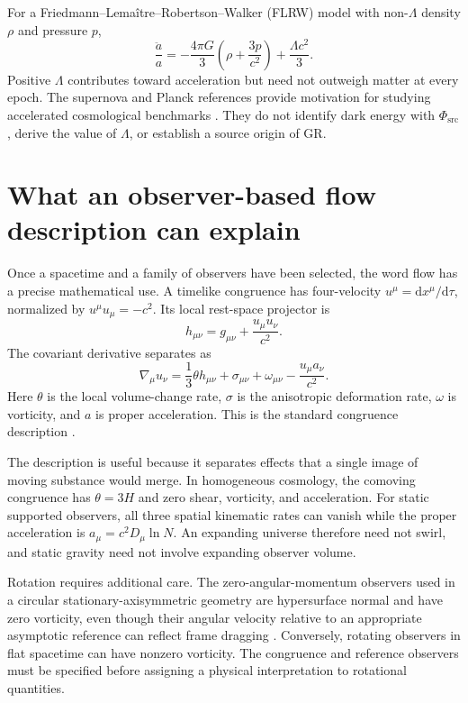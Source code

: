 \documentclass[11pt,oneside]{report}
\newcommand{\PhiSrc}{\Phi_{\mathrm{src}}}
\newcommand{\dd}{\mathrm d}
\theoremstyle{remark}
\numberwithin{definition}{chapter}
\numberwithin{proposition}{chapter}
\numberwithin{remark}{chapter}
\begin{document}
For a Friedmann--Lema\^itre--Robertson--Walker (FLRW) model with non-$\Lambda$ density $\rho$ and pressure $p$,
\begin{equation}
\frac{\ddot a}{a}=-\frac{4\pi G}{3}\left(\rho+\frac{3p}{c^2}\right)
+\frac{\Lambda c^2}{3}.
\end{equation}
Positive $\Lambda$ contributes toward acceleration but need not outweigh matter at every epoch. The supernova and Planck references provide motivation for studying accelerated cosmological benchmarks \parencite{Riess1998,Perlmutter1999,Planck2018Parameters}. They do not identify dark energy with $\PhiSrc$, derive the value of $\Lambda$, or establish a source origin of GR.

\section{What an observer-based flow description can explain}
Once a spacetime and a family of observers have been selected, the word flow has a precise mathematical use. A timelike congruence has four-velocity $u^\mu=\dd x^\mu/\dd\tau$, normalized by $u^\mu u_\mu=-c^2$. Its local rest-space projector is
\begin{equation}
h_{\mu\nu}=g_{\mu\nu}+\frac{u_\mu u_\nu}{c^2}.
\end{equation}
The covariant derivative separates as
\begin{equation}
\nabla_\mu u_\nu=\frac13\theta h_{\mu\nu}+\sigma_{\mu\nu}
+\omega_{\mu\nu}-\frac{u_\mu a_\nu}{c^2}.
\end{equation}
Here $\theta$ is the local volume-change rate, $\sigma$ is the anisotropic deformation rate, $\omega$ is vorticity, and $a$ is proper acceleration. This is the standard congruence description \parencite{EllisVanElst1999}.

The description is useful because it separates effects that a single image of moving substance would merge. In homogeneous cosmology, the comoving congruence has $\theta=3H$ and zero shear, vorticity, and acceleration. For static supported observers, all three spatial kinematic rates can vanish while the proper acceleration is $a_\mu=c^2D_\mu\ln N$. An expanding universe therefore need not swirl, and static gravity need not involve expanding observer volume.

Rotation requires additional care. The zero-angular-momentum observers used in a circular stationary-axisymmetric geometry are hypersurface normal and have zero vorticity, even though their angular velocity relative to an appropriate asymptotic reference can reflect frame dragging \parencite{Gourgoulhon2010}. Conversely, rotating observers in flat spacetime can have nonzero vorticity. The congruence and reference observers must be specified before assigning a physical interpretation to rotational quantities.
\end{document}
